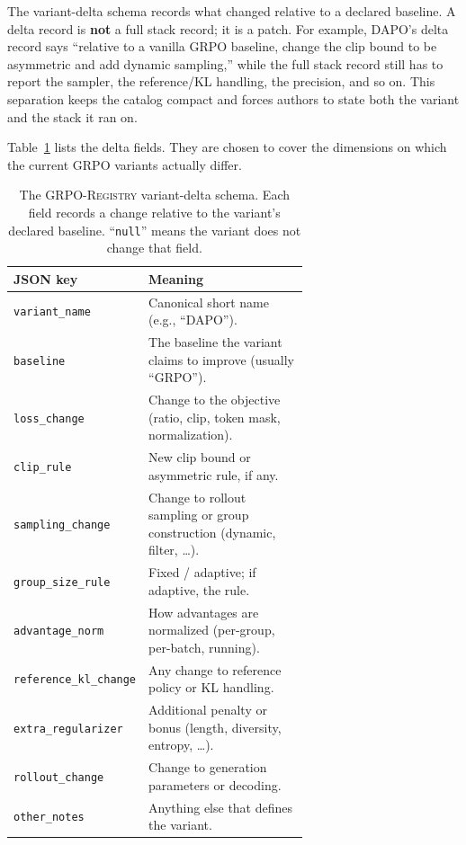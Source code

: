 \documentclass[11pt]{article}
\newcommand{\grpo}{\textsc{GRPO}}
\newcommand{\grpoReg}{\textsc{GRPO-Registry}}
\begin{document}
The variant-delta schema records what changed relative to a declared baseline.
A delta record is \textbf{not} a full stack record; it is a patch. For example,
DAPO's delta record says ``relative to a vanilla \grpo{} baseline, change the
clip bound to be asymmetric and add dynamic sampling,'' while the full stack
record still has to report the sampler, the reference/KL handling, the
precision, and so on. This separation keeps the catalog compact and forces
authors to state both the variant and the stack it ran on.

Table~\ref{tab:delta-schema} lists the delta fields. They are chosen to cover
the dimensions on which the current \grpo{} variants actually differ.

\begin{table}[t]
\centering
\caption{The \grpoReg{} variant-delta schema. Each field records a change
  relative to the variant's declared baseline. ``\texttt{null}'' means the
  variant does not change that field.}
\label{tab:delta-schema}
\small
\begin{tabular}{@{}lp{0.65\linewidth}@{}}
\toprule
\textbf{JSON key} & \textbf{Meaning}\\
\midrule
\texttt{variant\_name} & Canonical short name (e.g., ``DAPO'').\\
\texttt{baseline} & The baseline the variant claims to improve (usually
  ``GRPO'').\\
\texttt{loss\_change} & Change to the objective (ratio, clip, token mask,
  normalization).\\
\texttt{clip\_rule} & New clip bound or asymmetric rule, if any.\\
\texttt{sampling\_change} & Change to rollout sampling or group construction
  (dynamic, filter, \ldots).\\
\texttt{group\_size\_rule} & Fixed / adaptive; if adaptive, the rule.\\
\texttt{advantage\_norm} & How advantages are normalized (per-group,
  per-batch, running).\\
\texttt{reference\_kl\_change} & Any change to reference policy or KL handling.\\
\texttt{extra\_regularizer} & Additional penalty or bonus (length, diversity,
  entropy, \ldots).\\
\texttt{rollout\_change} & Change to generation parameters or decoding.\\
\texttt{other\_notes} & Anything else that defines the variant.\\
\bottomrule
\end{tabular}
\end{table}
\end{document}
